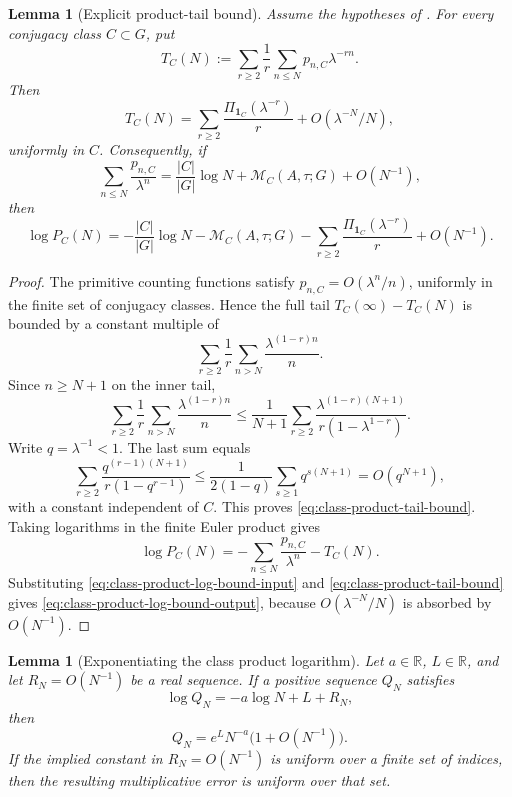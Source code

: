 \documentclass[11pt,a4paper]{amsart}
\theoremstyle{plain}
\newtheorem{lemma}[theorem]{Lemma}
\theoremstyle{definition}
\theoremstyle{remark}
\newcommand{\RR}{\mathbb{R}}
\begin{document}
\begin{lemma}[Explicit product-tail bound]
  \label{lem:class-euler-product-tail-bound}
  Assume the hypotheses of .  For every
  conjugacy class \(C\subset G\), put
  \[
    T_C(N):=
      \sum_{r\ge2}\frac1r\sum_{n\le N}p_{n,C}\lambda^{-rn}.
  \]
  Then
  \begin{equation}\label{eq:class-product-tail-bound}
    T_C(N)=
      \sum_{r\ge2}\frac{\Pi_{\mathbf1_C}(\lambda^{-r})}{r}
      +O(\lambda^{-N}/N),
  \end{equation}
  uniformly in \(C\). Consequently, if
  \begin{equation}\label{eq:class-product-log-bound-input}
    \sum_{n\le N}\frac{p_{n,C}}{\lambda^n}
    =
    \frac{|C|}{|G|}\log N+\mathcal M_C(A,\tau;G)+O(N^{-1}),
  \end{equation}
  then
  \begin{equation}\label{eq:class-product-log-bound-output}
    \log P_C(N)=
    -\frac{|C|}{|G|}\log N
    -\mathcal M_C(A,\tau;G)
    -\sum_{r\ge2}\frac{\Pi_{\mathbf1_C}(\lambda^{-r})}{r}
    +O(N^{-1}).
  \end{equation}
\end{lemma}

\begin{proof}
  The primitive counting functions satisfy \(p_{n,C}=O(\lambda^n/n)\),
  uniformly in the finite set of conjugacy classes. Hence the full tail
  \(T_C(\infty)-T_C(N)\) is bounded by a constant multiple of
  \[
    \sum_{r\ge2}\frac1r\sum_{n>N}\frac{\lambda^{(1-r)n}}{n}.
  \]
  Since \(n\ge N+1\) on the inner tail,
  \[
    \sum_{r\ge2}\frac1r\sum_{n>N}\frac{\lambda^{(1-r)n}}{n}
    \le
    \frac{1}{N+1}
    \sum_{r\ge2}\frac{\lambda^{(1-r)(N+1)}}{r(1-\lambda^{1-r})}.
  \]
  Write \(q=\lambda^{-1}<1\).  The last sum equals
  \[
    \sum_{r\ge2}\frac{q^{(r-1)(N+1)}}{r(1-q^{r-1})}
    \le
    \frac{1}{2(1-q)}\sum_{s\ge1}q^{s(N+1)}
    =O(q^{N+1}),
  \]
  with a constant independent of \(C\).  This proves
  \eqref{eq:class-product-tail-bound}.  Taking logarithms in the finite
  Euler product gives
  \[
    \log P_C(N)=
    -\sum_{n\le N}\frac{p_{n,C}}{\lambda^n}-T_C(N).
  \]
  Substituting \eqref{eq:class-product-log-bound-input} and
  \eqref{eq:class-product-tail-bound} gives
  \eqref{eq:class-product-log-bound-output}, because
  \(O(\lambda^{-N}/N)\) is absorbed by \(O(N^{-1})\).
\end{proof}

\begin{lemma}[Exponentiating the class product logarithm]
  \label{lem:class-product-log-to-product-error}
  Let \(a\in\RR\), \(L\in\RR\), and let \(R_N=O(N^{-1})\) be a real sequence.
  If a positive sequence \(Q_N\) satisfies
  \[
    \log Q_N=-a\log N+L+R_N,
  \]
  then
  \[
    Q_N=e^L N^{-a}\bigl(1+O(N^{-1})\bigr).
  \]
  If the implied constant in \(R_N=O(N^{-1})\) is uniform over a finite set of
  indices, then the resulting multiplicative error is uniform over that set.
\end{lemma}
\end{document}
